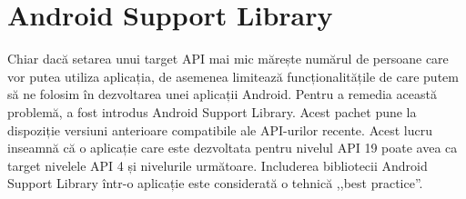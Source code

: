 \section{Android Support Library}
Chiar dacă setarea unui target API mai mic mărește numărul de persoane care vor putea utiliza aplicația, de asemenea limitează funcționalitățile de care putem să ne folosim în dezvoltarea unei aplicații Android. Pentru a remedia această problemă, a fost introdus Android Support Library.
Acest pachet pune la dispoziție versiuni anterioare compatibile ale API-urilor recente.\newline 
Acest lucru inseamnă că o aplicație care este dezvoltata pentru nivelul API 19 poate avea ca target nivelele API 4 și nivelurile următoare.\newline 
Includerea bibliotecii Android Support Library într-o aplicație este considerată o tehnică ,,best practice''.\cite{1}

